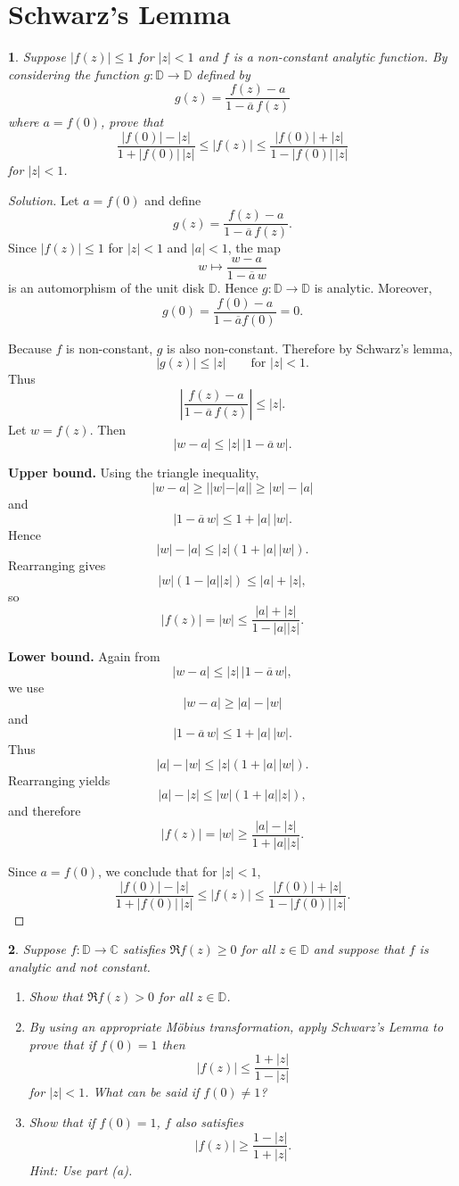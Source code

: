 \documentclass[12pt, a4paper]{report}
\theoremstyle{spaced}
\newtheorem{exercise}{}
\newcommand{\setexercise}[1]{\setcounter{exercise}{#1-1}}
\begin{document}
\section{Schwarz's Lemma}
\setexercise{1}
\begin{exercise}
	Suppose $|f(z)| \le 1$ for $|z|<1$ and $f$ is a non-constant analytic function.
	By considering the function $g : \mathbb{D} \to \mathbb{D}$ defined by
	\[
		g(z) = \frac{f(z)-a}{1-\overline{a}\,f(z)}
	\]
	where $a = f(0)$, prove that
	\[
		\frac{|f(0)|-|z|}{1+|f(0)|\,|z|}
		\le |f(z)| \le
		\frac{|f(0)|+|z|}{1-|f(0)|\,|z|}
	\]
	for $|z|<1$.
\end{exercise}

\begin{proof}[Solution]
	Let $a=f(0)$ and define
	\[
		g(z)=\frac{f(z)-a}{1-\overline{a}\,f(z)}.
	\]
	Since $|f(z)|\le 1$ for $|z|<1$ and $|a|<1$, the map
	\[
		w \mapsto \frac{w-a}{1-\overline{a}\,w}
	\]
	is an automorphism of the unit disk $\mathbb{D}$. Hence $g:\mathbb{D}\to\mathbb{D}$ is analytic. Moreover,
	\[
		g(0)=\frac{f(0)-a}{1-\overline{a}f(0)}=0.
	\]

	Because $f$ is non-constant, $g$ is also non-constant. Therefore by Schwarz's lemma,
	\[
		|g(z)|\le |z| \qquad \text{for } |z|<1.
	\]
	Thus
	\[
		\left|\frac{f(z)-a}{1-\overline{a}\,f(z)}\right|\le |z|.
	\]
	Let $w=f(z)$. Then
	\[
		|w-a|\le |z|\,|1-\overline{a}\,w|.
	\]

	\textbf{Upper bound.}
	Using the triangle inequality,
	\[
		|w-a|\ge ||w|-|a|| \ge |w|-|a|
	\]
	and
	\[
		|1-\overline{a}\,w|\le 1+|a|\,|w|.
	\]
	Hence
	\[
		|w|-|a|\le |z|(1+|a|\,|w|).
	\]
	Rearranging gives
	\[
		|w|(1-|a||z|)\le |a|+|z|,
	\]
	so
	\[
		|f(z)|=|w|\le \frac{|a|+|z|}{1-|a||z|}.
	\]

	\textbf{Lower bound.}
	Again from
	\[
		|w-a|\le |z|\,|1-\overline{a}\,w|,
	\]
	we use
	\[
		|w-a|\ge |a|-|w|
	\]
	and
	\[
		|1-\overline{a}\,w|\le 1+|a|\,|w|.
	\]
	Thus
	\[
		|a|-|w|\le |z|(1+|a|\,|w|).
	\]
	Rearranging yields
	\[
		|a|-|z|\le |w|(1+|a||z|),
	\]
	and therefore
	\[
		|f(z)|=|w|\ge \frac{|a|-|z|}{1+|a||z|}.
	\]

	Since $a=f(0)$, we conclude that for $|z|<1$,
	\[
		\frac{|f(0)|-|z|}{1+|f(0)|\,|z|}
		\le |f(z)| \le
		\frac{|f(0)|+|z|}{1-|f(0)|\,|z|}.
	\]
\end{proof}

\setexercise{3}
\begin{exercise}
	Suppose $f:\mathbb{D}\to\mathbb{C}$ satisfies $\Re f(z)\ge 0$ for all $z\in\mathbb{D}$ and suppose that $f$ is analytic and not constant.
	\begin{enumerate}[label=(\alph*)]
		\item Show that $\Re f(z)>0$ for all $z\in\mathbb{D}$.
		\item By using an appropriate M\"obius transformation, apply Schwarz's Lemma to prove that if $f(0)=1$ then
		      \[
			      |f(z)| \le \frac{1+|z|}{1-|z|}
		      \]
		      for $|z|<1$. What can be said if $f(0)\ne 1$?
		\item Show that if $f(0)=1$, $f$ also satisfies
		      \[
			      |f(z)| \ge \frac{1-|z|}{1+|z|}.
		      \]
		      Hint: Use part (a).
	\end{enumerate}
\end{exercise}
\end{document}
